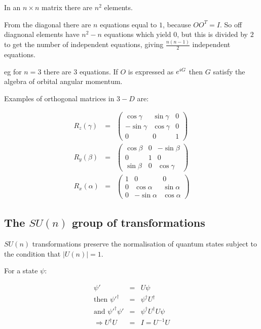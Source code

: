 In an $n\times n$ matrix there are $n^2$ elements.

From the diagonal there are $n$ equations equal to $1$, because $OO^T = I$.  So off diagnonal elements have $n^2 - n$ equations which yield $0$, but this is divided by $2$ to get the number of independent equations, giving $\frac{n(n-1)}{2}$ independent equations.

eg for $n = 3$ there are $3$ equations.  If $O$ is expressed as $e^{iG}$ then $G$ satisfy the algebra of orbital angular momentum.

Examples of orthogonal matrices in $3-D$ are:

\begin{eqnarray*}
  R_z(\gamma) & = &
  \left(
  \begin{array}{ccc}
    \cos\gamma  & \sin\gamma & 0 \\
    -\sin\gamma & \cos\gamma & 0 \\
    0 & 0 & 1
  \end{array}
  \right)
  \\
  R_y(\beta) & = &
  \left(
  \begin{array}{ccc}
    \cos\beta  & 0 & -\sin\beta \\
    0 & 1 & 0 \\
    \sin\beta  & 0 & \cos\gamma
  \end{array}
  \right)
  \\
  R_x(\alpha) & = &
  \left(
  \begin{array}{ccc}
    1 & 0 & 0 \\
    0 & \cos\alpha  & \sin\alpha \\
    0 & -\sin\alpha & \cos\alpha
  \end{array}
  \right)
\end{eqnarray*}

\subsection{The \texorpdfstring{$SU(n)$}{SUN} group of transformations}

$SU(n)$ transformations preserve the normalisation of quantum states subject to the condition that $|U(n)| = 1$.

For a state $\psi:$

\begin{eqnarray*}
  \psi' & = & U\psi \\
  \textrm{then } \psi'^{\dagger} & = & \psi^{\dagger}U^{\dagger} \\
  \textrm{and }  \psi'^{\dagger}\psi' & = & \psi^{\dagger}U^{\dagger}U\psi \\
  \Rightarrow U^{\dagger}U & = & I = U^{-1}U
\end{eqnarray*}

